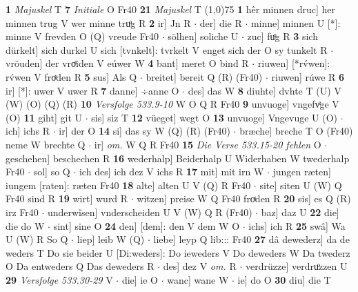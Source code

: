 \documentclass[8pt,a4paper,notitlepage]{article}
\begin{document}
\begin{table}[ht]
\begin{minipage}[t]{0.5\linewidth}
\textbf{1} \textit{Majuskel} T  \textbf{7} \textit{Initiale} O Fr40  \textbf{21} \textit{Majuskel} T  \newline
\line(1,0){75} \newline
\textbf{1} hêr minnen druc] her minnen trug V wer minne truͦg R \textbf{2} ir] Jn R  $\cdot$ der] die R  $\cdot$ minne] minnen U [*]: minne V frevden O (Q) vreude Fr40  $\cdot$ sölhen] soliche U  $\cdot$ zuc] fuͦg R \textbf{3} sich dürkelt] sich durkel U sich [tvnkelt]: tvrkelt V enget sich der O sy tunkelt R  $\cdot$ vröuden] der vroͤiden V eúwer W \textbf{4} bant] meret O bind R  $\cdot$ riuwen] [*rv́wen]: rv́wen V froͯden R \textbf{5} sus] Als Q  $\cdot$ breitet] bereit Q (R) (Fr40)  $\cdot$ riuwen] rúwe R \textbf{6} ir] [*]: uwer V uwer R \textbf{7} danne] ÷anne O  $\cdot$ des] das W \textbf{8} diuhte] dvhte T (U) V (W) (O) (Q) (R) \textbf{10} \textit{Versfolge 533.9-10} W O Q R Fr40  \textbf{9} unvuoge] vngefvͤge V (O) \textbf{11} giht] git U  $\cdot$ sis] siz T \textbf{12} vüeget] wegt O \textbf{13} unvuoge] Vngevuge U (O)  $\cdot$ ich] ichs R  $\cdot$ ir] der O \textbf{14} si] das sy W (Q) (R) (Fr40)  $\cdot$ bræche] breche T O (Fr40) neme W brechte Q  $\cdot$ ir] \textit{om.} W Q R Fr40 \textbf{15} \textit{Die Verse 533.15-20 fehlen} O   $\cdot$ geschehen] beschechen R \textbf{16} wederhalp] Beiderhalp U Widerhaben W twederhalp Fr40  $\cdot$ sol] so Q  $\cdot$ ich des] ich dez V ichs R \textbf{17} mit] mit irn W  $\cdot$ jungen ræten] iungem [raten]: ræten Fr40 \textbf{18} alte] alten U V (Q) R Fr40  $\cdot$ site] siten U (W) Q Fr40 sind R \textbf{19} wirt] wurd R  $\cdot$ witzen] preise W Q Fr40 froͯden R \textbf{20} sis] es Q (R) irz Fr40  $\cdot$ underwîsen] vnderscheiden U V (W) Q R (Fr40)  $\cdot$ baz] daz U \textbf{22} die] die do W  $\cdot$ sint] sine O \textbf{24} den] [dem]: den V dem W O  $\cdot$ ichs] ich R \textbf{25} swâ] Wa U (W) R So Q  $\cdot$ liep] leib W (Q)  $\cdot$ liebe] leyp Q lib::: Fr40 \textbf{27} dâ dewederz] da de weders T Do sie beider U [Di:weders]: Do ieweders V Do deweders W Da twederz O Da entweders Q Das deweders R  $\cdot$ des] dez V \textit{om.} R  $\cdot$ verdrüzze] verdruͦzzen U \textbf{29} \textit{Versfolge 533.30-29} V   $\cdot$ die] ie O  $\cdot$ wanc] wane W  $\cdot$ ie] do O \textbf{30} diu] die T \newline
\end{minipage}
\end{table}
\end{document}
